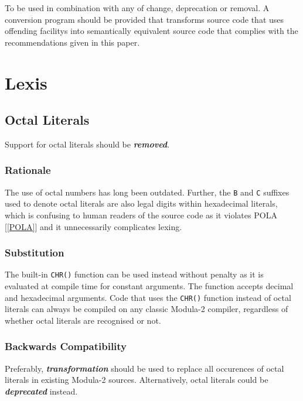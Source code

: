 \documentclass[10pt,a4paper]{article}
\renewcommand{\emph}[1]{\textbf{\textit{#1}}}
\begin{document}
To be used in combination with any of change, deprecation or removal.
A conversion program should be provided that transforms source code that uses
\glspl{offending facility} into semantically equivalent source code that
complies with the recommendations given in this paper.


\section{Lexis}

\subsection{Octal Literals}

Support for octal literals should be \emph{removed}.

\subsubsection{Rationale}

The use of octal numbers has long been outdated. Further, the \verb|B| and
\verb|C| suffixes used to denote octal literals are also legal digits within
hexadecimal literals, which is confusing to human readers of the source code as
it violates POLA [\ref{POLA}] and it unnecessarily complicates lexing.

\subsubsection{Substitution}

The built-in \verb|CHR()| function can be used instead without penalty as it is
evaluated at compile time for constant arguments. The function accepts decimal
and hexadecimal arguments. Code that uses the \verb|CHR()| function instead of
octal literals can always be compiled on any classic Modula-2 compiler,
regardless of whether octal literals are recognised or not.

\subsubsection{Backwards Compatibility}

Preferably, \emph{transformation} should be used to replace all occurences of
octal literals in existing Modula-2 sources. Alternatively, octal literals
could be \emph{deprecated} instead.
\end{document}
